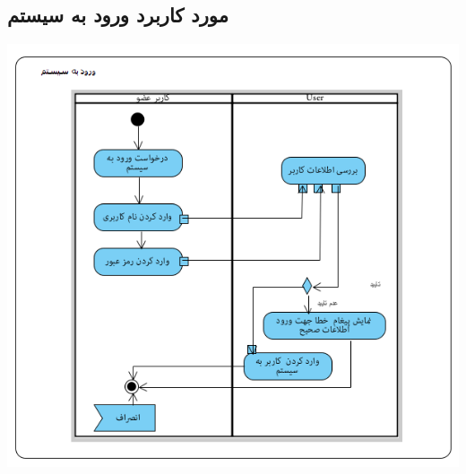 \newpage
\vspace{2cm}
\subsection*{مورد کاربرد ورود به سیستم}
\vspace{2cm}
\begin{center}
\includegraphics[width=\textwidth]{ActivityDiagramsWithSwimlanes/10.png}
\end{center}

\newpage
\vspace{2cm}
